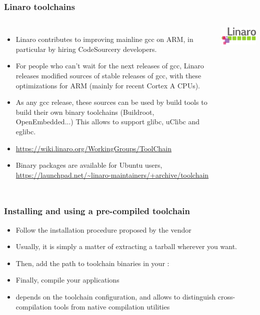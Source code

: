\begin{frame}
  \frametitle{Linaro toolchains}
  \begin{columns}
    \begin{itemize}
    \item Linaro contributes to improving mainline gcc on ARM, in
      particular by hiring CodeSourcery developers.
    \item For people who can't wait for the next releases of gcc, Linaro
      releases modified sources of stable releases of gcc, with these
      optimizations for ARM (mainly for recent Cortex A CPUs).
    \item As any gcc release, these sources can be used by build tools
      to build their own binary toolchains (Buildroot, OpenEmbedded...)
      This allows to support glibc, uClibc and eglibc.
    \item \small\url{https://wiki.linaro.org/WorkingGroups/ToolChain}\normalsize
    \item Binary packages are available for Ubuntu users,
      \url{https://launchpad.net/~linaro-maintainers/+archive/toolchain}
    \end{itemize}
    \includegraphics[width=\textwidth]{slides/sysdev-toolchains-obtaining/linaro.png}
  \end{columns}
\end{frame}

\begin{frame}
  \frametitle{Installing and using a pre-compiled toolchain}
  \begin{itemize}
  \item Follow the installation procedure proposed by the vendor
  \item Usually, it is simply a matter of extracting a tarball
        wherever you want.
  \item Then, add the path to toolchain binaries in your :\\
  \item Finally, compile your applications\\
  \item {} depends on the toolchain configuration, and
    allows to distinguish cross-compilation tools from native
    compilation utilities
  \end{itemize}
\end{frame}

